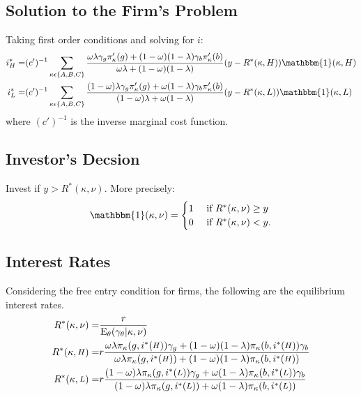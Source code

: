 \documentclass[notitlepage]{article}
\begin{document}
\subsection{Solution to the Firm's Problem}
Taking first order conditions and solving for $i$:
\begin{align}
i^{*}_{H} = & (c')^{-1}\sum_{\kappa \epsilon \{A,B,C\}} \frac{\omega\lambda\gamma_{g}\pi_{\kappa}'(g)+(1-\omega)(1-\lambda)\gamma_{b}\pi_{\kappa}'(b)}{\omega\lambda+(1-\omega)(1-\lambda)}(y-R^{*}(\kappa,H))\mathbbm{1}(\kappa,H)\\
i^{*}_{L} = & (c')^{-1}\sum_{\kappa \epsilon \{A,B,C\}} \frac{(1-\omega)\lambda\gamma_{g}\pi_{\kappa}'(g)+\omega(1-\lambda)\gamma_{b}\pi_{\kappa}'(b)}{(1-\omega)\lambda+\omega(1-\lambda)}(y-R^{*}(\kappa,L))\mathbbm{1}(\kappa,L)
\end{align}
where $(c')^{-1}$ is the inverse marginal cost function.

\subsection{Investor's Decsion}
Invest if $y>R^{*}(\kappa,\nu)$. More precisely:
\begin{align*}
\mathbbm{1}(\kappa,\nu)=
\begin{cases}
1 & \text{ if } R^{*}(\kappa,\nu)\geq y \\ 
0 & \text{ if } R^{*}(\kappa,\nu)< y. 
\end{cases}
\end{align*}

\subsection{Interest Rates}
Considering the free entry condition for firms, the following are the equilibrium interest rates.
\begin{align}
R^{*}(\kappa,\nu) = & \frac{r}{\textup{E}_{\theta}(\gamma_{\theta}|\kappa,\nu)}\nonumber\\
R^{*}(\kappa,\medmath{H}) = & r\frac{\omega\lambda\pi_{\kappa}(g,i^{*}(\medmath{H}))\gamma_{g}+(1-\omega)(1-\lambda)\pi_{\kappa}(b,i^{*}(\medmath{H}))\gamma_{b}}{\omega\lambda\pi_{\kappa}(g,i^{*}(\medmath{H}))+(1-\omega)(1-\lambda)\pi_{\kappa}(b,i^{*}(\medmath{H}))}\\
R^{*}(\kappa,\medmath{L}) = & r\frac{(1-\omega)\lambda\pi_{\kappa}(g,i^{*}(\medmath{L}))\gamma_{g}+\omega(1-\lambda)\pi_{\kappa}(b,i^{*}(\medmath{L}))\gamma_{b}}{(1-\omega)\lambda\pi_{\kappa}(g,i^{*}(\medmath{L}))+\omega(1-\lambda)\pi_{\kappa}(b,i^{*}(\medmath{L}))}
\end{align}
\end{document}

